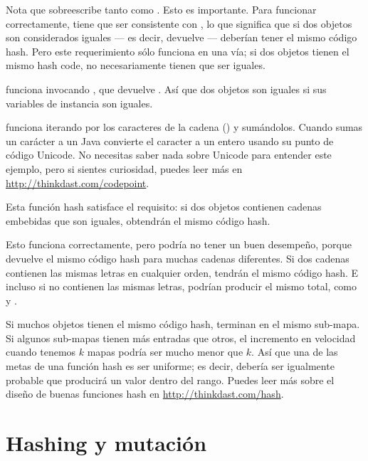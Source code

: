 \documentclass[12pt]{book}
\theoremstyle{exercise}
\begin{document}
Nota que  sobreescribe tanto  como
. Esto es importante. Para funcionar correctamente,
 tiene que ser consistente con , lo que significa
que si dos objetos son considerados iguales --- es decir, 
devuelve  --- deberían tener el mismo código hash. Pero este
requerimiento sólo funciona en una vía; si dos objetos tienen el mismo
hash code, no necesariamente tienen que ser iguales.


 funciona invocando , que devuelve
. Así que dos objetos  son iguales si
sus variables de instancia  son iguales.


 funciona iterando por los caracteres de la cadena ()
y sumándolos. Cuando sumas un carácter a un  Java convierte el
caracter a un entero usando su punto de código Unicode.  No necesitas
saber nada sobre Unicode para entender este ejemplo, pero si sientes
curiosidad, puedes leer más en
\url{http://thinkdast.com/codepoint}.


Esta función hash satisface el requisito: si dos objetos
 contienen cadenas embebidas que son iguales,
obtendrán el mismo código hash.

Esto funciona correctamente, pero podría no tener un buen desempeño,
porque devuelve el mismo código hash para muchas cadenas diferentes. Si
dos cadenas contienen las mismas letras en cualquier orden, tendrán el
mismo código hash. E incluso si no contienen las mismas letras, podrían
producir el mismo total, como  y .

Si muchos objetos tienen el mismo código hash, terminan en el mismo
sub-mapa. Si algunos sub-mapas tienen más entradas que otros, el incremento
en velocidad cuando tenemos $k$ mapas podría ser mucho menor que $k$. Así
que una de las metas de una función hash es ser uniforme; es decir, debería
ser igualmente probable que producirá un valor dentro del rango.  Puedes leer
más sobre el diseño de buenas funciones hash en
\url{http://thinkdast.com/hash}.


\section{Hashing y mutación}
\label{hashing-and-mutation}
\end{document}
